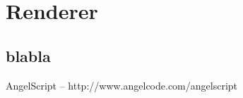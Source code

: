 \documentclass[a4paper, 12pt]{report}
\begin{document}
\chapter{Renderer}

\section{blabla}


\begin{thebibliography}{9}
AngelScript -- http://www.angelcode.com/angelscript

\end{thebibliography}

\clearpage
{}
\listoffigures

\clearpage
{}
\listoftables
\end{document}
